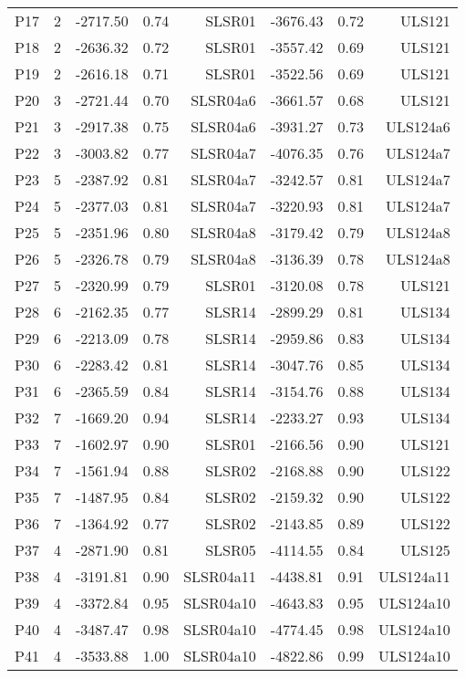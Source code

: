 \begin{center}
\begin{supertabular}{|c|c|rrr|rrr|}
P17 & 2 & -2717.50 & 0.74 & SLSR01 & -3676.43 & 0.72 & ULS121\\
P18 & 2 & -2636.32 & 0.72 & SLSR01 & -3557.42 & 0.69 & ULS121\\
P19 & 2 & -2616.18 & 0.71 & SLSR01 & -3522.56 & 0.69 & ULS121\\
P20 & 3 & -2721.44 & 0.70 & SLSR04a6 & -3661.57 & 0.68 & ULS121\\
P21 & 3 & -2917.38 & 0.75 & SLSR04a6 & -3931.27 & 0.73 & ULS124a6\\
P22 & 3 & -3003.82 & 0.77 & SLSR04a7 & -4076.35 & 0.76 & ULS124a7\\
P23 & 5 & -2387.92 & 0.81 & SLSR04a7 & -3242.57 & 0.81 & ULS124a7\\
P24 & 5 & -2377.03 & 0.81 & SLSR04a7 & -3220.93 & 0.81 & ULS124a7\\
P25 & 5 & -2351.96 & 0.80 & SLSR04a8 & -3179.42 & 0.79 & ULS124a8\\
P26 & 5 & -2326.78 & 0.79 & SLSR04a8 & -3136.39 & 0.78 & ULS124a8\\
P27 & 5 & -2320.99 & 0.79 & SLSR01 & -3120.08 & 0.78 & ULS121\\
P28 & 6 & -2162.35 & 0.77 & SLSR14 & -2899.29 & 0.81 & ULS134\\
P29 & 6 & -2213.09 & 0.78 & SLSR14 & -2959.86 & 0.83 & ULS134\\
P30 & 6 & -2283.42 & 0.81 & SLSR14 & -3047.76 & 0.85 & ULS134\\
P31 & 6 & -2365.59 & 0.84 & SLSR14 & -3154.76 & 0.88 & ULS134\\
P32 & 7 & -1669.20 & 0.94 & SLSR14 & -2233.27 & 0.93 & ULS134\\
P33 & 7 & -1602.97 & 0.90 & SLSR01 & -2166.56 & 0.90 & ULS121\\
P34 & 7 & -1561.94 & 0.88 & SLSR02 & -2168.88 & 0.90 & ULS122\\
P35 & 7 & -1487.95 & 0.84 & SLSR02 & -2159.32 & 0.90 & ULS122\\
P36 & 7 & -1364.92 & 0.77 & SLSR02 & -2143.85 & 0.89 & ULS122\\
P37 & 4 & -2871.90 & 0.81 & SLSR05 & -4114.55 & 0.84 & ULS125\\
P38 & 4 & -3191.81 & 0.90 & SLSR04a11 & -4438.81 & 0.91 & ULS124a11\\
P39 & 4 & -3372.84 & 0.95 & SLSR04a10 & -4643.83 & 0.95 & ULS124a10\\
P40 & 4 & -3487.47 & 0.98 & SLSR04a10 & -4774.45 & 0.98 & ULS124a10\\
P41 & 4 & -3533.88 & 1.00 & SLSR04a10 & -4822.86 & 0.99 & ULS124a10\\

\end{supertabular}
\end{center}
